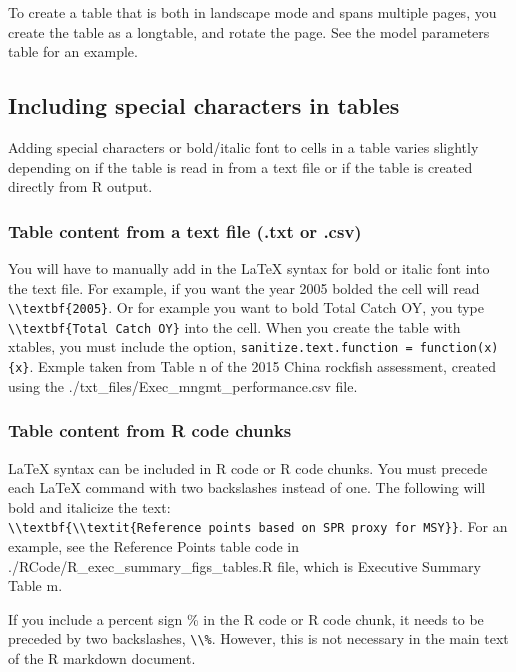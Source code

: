 \documentclass[12pt,]{article}
\begin{document}
To create a table that is both in landscape mode and spans multiple
pages, you create the table as a longtable, and rotate the page. See the
model parameters table for an example.

\subsection{Including special characters in
tables}\label{including-special-characters-in-tables}

Adding special characters or bold/italic font to cells in a table varies
slightly depending on if the table is read in from a text file or if the
table is created directly from R output.

\subsubsection{Table content from a text file (.txt or
.csv)}\label{table-content-from-a-text-file-.txt-or-.csv}

You will have to manually add in the LaTeX syntax for bold or italic
font into the text file. For example, if you want the year 2005 bolded
the cell will read
\texttt{\textbackslash{}\textbackslash{}textbf\{2005\}}. Or for example
you want to bold Total Catch OY, you type
\texttt{\textbackslash{}\textbackslash{}textbf\{Total\ Catch\ OY\}} into
the cell. When you create the table with xtables, you must include the
option, \texttt{sanitize.text.function\ =\ function(x)\{x\}}. Exmple
taken from Table n of the 2015 China rockfish assessment, created using
the ./txt\_files/Exec\_mngmt\_performance.csv file.

\subsubsection{Table content from R code
chunks}\label{table-content-from-r-code-chunks}

LaTeX syntax can be included in R code or R code chunks. You must
precede each LaTeX command with two backslashes instead of one. The
following will bold and italicize the text:
\texttt{\textbackslash{}\textbackslash{}textbf\{\textbackslash{}\textbackslash{}textit\{Reference\ points\ based\ on\ SPR\ proxy\ for\ MSY\}\}}.
For an example, see the Reference Points table code in
./RCode/R\_exec\_summary\_figs\_tables.R file, which is Executive
Summary Table m.

If you include a percent sign \% in the R code or R code chunk, it needs
to be preceded by two backslashes,
\texttt{\textbackslash{}\textbackslash{}\%}. However, this is not
necessary in the main text of the R markdown document.
\end{document}
